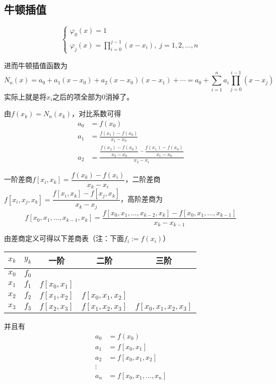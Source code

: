 \subsection{牛顿插值}
\begin{definition}[牛顿插值基函数]
\[\begin{cases}
\varphi_0(x)=1\\
\varphi_j(x)=\displaystyle\prod_{i=0}^{j-1}(x-x_i),\;j=1,2,\ldots,n
\end{cases}\]
\end{definition}
\par 进而牛顿插值函数为
\[N_n(x)=a_0+a_1(x-x_0)+a_2(x-x_0)(x-x_1)+\cdots=a_0+\sum_{i=1}^na_i\prod_{j=0}^{i-1}(x-x_j)\]
实际上就是将$x_i$之后的项全部为$0$消掉了。
\par 由$f(x_k)=N_n(x_k)$，对比系数可得
\[\begin{aligned}
a_0 &=f(x_0)\\
a_1 &=\frac{f(x_1)-f(x_0)}{x_1-x_0}\\
a_2 &=\frac{\dfrac{f(x_2)-f(x_0)}{x_2-x_0}-\dfrac{f(x_1)-f(x_0)}{x_1-x_0}}{x_2-x_1}
\end{aligned}\]

\begin{definition}[差商]
一阶差商$f[x_i,x_k]=\dfrac{f(x_k)-f(x_i)}{x_k-x_i}$，二阶差商$f[x_i,x_j,x_k]=\dfrac{f[x_i,x_k]-f[x_j,x_k]}{x_k-x_j}$，高阶差商为
\[f[x_0,x_1,\ldots,x_{k-1},x_k]=\frac{f[x_0,x_1,\ldots,x_{k-2},x_k]-f[x_0,x_1,\ldots,x_{k-1}]}{x_k-x_{k-1}}\]
\end{definition}
由差商定义可得以下差商表（注：下面$f_i:=f(x_i)$）
\begin{center}
\begin{tabular}{ccccc}\hline
$x_k$ & $y_k$ & 一阶 & 二阶 & 三阶\\\hline
$x_0$ & $f_0$ & & &\\
$x_1$ & $f_1$ & $f[x_0,x_1]$ & &\\
$x_2$ & $f_2$ & $f[x_1,x_2]$ & $f[x_0,x_1,x_2]$ &\\
$x_3$ & $f_3$ & $f[x_2,x_3]$ & $f[x_1,x_2,x_3]$ & $f[x_0,x_1,x_2,x_3]$ \\\hline
\end{tabular}
\end{center}
并且有
\[\begin{aligned}
a_0&=f(x_0)\\
a_1&=f[x_0,x_1]\\
a_2&=f[x_0,x_1,x_2]\\
\vdots\\
a_n&=f[x_0,x_1,\ldots,x_n]
\end{aligned}\]

